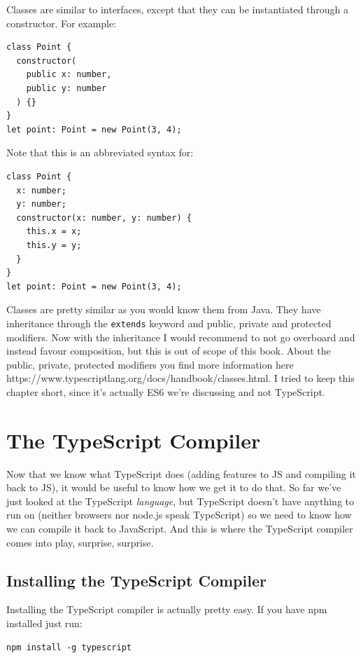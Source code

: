 \documentclass[12pt,a4paper]{report}
\begin{document}
Classes are similar to interfaces, except that they can be instantiated through a constructor. For example:
\begin{lstlisting}
class Point {
  constructor(
    public x: number,
    public y: number
  ) {}
}
let point: Point = new Point(3, 4);
\end{lstlisting}
Note that this is an abbreviated syntax for:
\begin{lstlisting}
class Point {
  x: number;
  y: number;
  constructor(x: number, y: number) {
    this.x = x;
    this.y = y;
  }
}
let point: Point = new Point(3, 4);
\end{lstlisting}

Classes are pretty similar as you would know them from Java. They have inheritance through the \texttt{extends} keyword and public, private and protected modifiers. Now with the inheritance I would recommend to not go overboard and instead favour composition, but this is out of scope of this book. About the public, private, protected modifiers you find more information here https://www.typescriptlang.org/docs/handbook/classes.html. I tried to keep this chapter short, since it's actually ES6 we're discussing and not TypeScript.

\section{The TypeScript Compiler}
Now that we know what TypeScript does (adding features to JS and compiling it back to JS), it would be useful to know how we get it to do that. So far we've just looked at the TypeScript \textit{language}, but TypeScript doesn't have anything to run on (neither browsers nor node.js speak TypeScript) so we need to know how we can compile it back to JavaScript. And this is where the TypeScript compiler comes into play, surprise, surprise.

\subsection{Installing the TypeScript Compiler}
Installing the TypeScript compiler is actually pretty easy. If you have npm installed just run:
\begin{lstlisting}
npm install -g typescript
\end{lstlisting}
\end{document}
